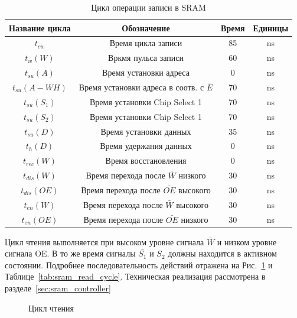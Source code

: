 \begin{table}[H]
\begin{center}
\caption{Цикл операции записи в SRAM}
\label{tab:sram_write_cycle}
\begin{tabular}{|c|c|c|c|}
	\hline
		Название цикла & Обозначение & Время & Единицы \\
	\hline
		${t_{cw}}$ & Время цикла записи & 85 & ns \\
	\hline
		${t_w(W)}$ & Вркмя пульса записи & 60 & ns \\
	\hline
		${t_{su}(A)}$ & Время установки адреса & 0 & ns \\
	\hline
		${t_{su}(A-WH)}$ & Время установки адреса в соотв. с $\bar{E}$ & 70 & ns \\
	\hline
		${t_{su}(S_1)}$ & Время установки Chip Select 1 & 70 & ns \\
	\hline
		${t_{su}(S_2)}$ & Время установки Chip Select 1 & 70 & ns \\
	\hline
		${t_{su}(D)}$ & Время установки данных & 35 & ns \\
	\hline
		${t_{h}(D)}$ & Время удержания данных & 0 & ns \\
	\hline
		${t_{rec}(W)}$ & Время восстановления & 0 & ns \\
	\hline
		${t_{dis}(W)}$ & Время перехода после $\bar{W}$ низкого & 30 & ns \\
	\hline
		${t_{dis}(OE)}$ & Время перехода после $\bar{OE}$ высокого & 30 & ns \\
	\hline
		${t_{en}(W)}$ & Время перехода после $\bar{W}$ высокого & 30 & ns \\
	\hline
		${t_{en}(OE)}$ & Время перехода после $\bar{OE}$ низкого & 30 & ns \\
	\hline
\end{tabular}
\end{center}
\end{table}

Цикл чтения выполняется при высоком уровне сигнала $\bar{W}$ и низком уровне сигнала OE. В то же время сигналы
$\bar{S_1}$ и ${S_2}$ должны находится в активном состоянии. Подробнее последовательность действий отражена на
Рис.~\ref{pic:sram_read_cycle} и Таблице~\ref{tab:sram_read_cycle}.
Техническая реализация рассмотрена в разделе~\ref{sec:sram_controller} \\

\begin{figure}[H]
\caption{Цикл чтения}
\label{pic:sram_read_cycle}
\end{figure}

